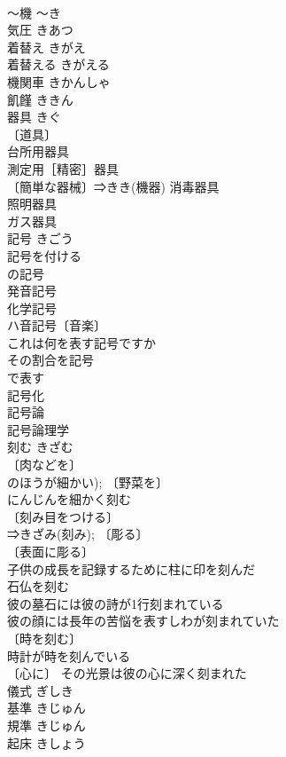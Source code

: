 \documentclass[8pt]{extreport}
\begin{document}
\begin{CJK}{UTF8}{min}
\\	～機	～き	
\\	気圧	きあつ	
\\	着替え	きがえ	
\\	着替える	きがえる	
\\	機関車	きかんしゃ	
\\	飢饉	ききん	
\\	器具	きぐ	
\\	〔道具〕
\\	台所用器具 
\\	測定用［精密］器具 
\\	〔簡単な器械〕⇒きき(機器) 消毒器具 
\\	照明器具 
\\	ガス器具 
\\	記号	きごう	
\\	記号を付ける 
\\	の記号 
\\	発音記号 
\\	化学記号 
\\	ハ音記号〔音楽〕 
\\	これは何を表す記号ですか 
\\	その割合を記号
\\	で表す 
\\	記号化 
\\	記号論 
\\	記号論理学 
\\	刻む	きざむ	
\\	〔肉などを〕
\\	のほうが細かい); 〔野菜を〕
\\	にんじんを細かく刻む 
\\	〔刻み目をつける〕
\\	⇒きざみ(刻み); 〔彫る〕
\\	〔表面に彫る〕
\\	子供の成長を記録するために柱に印を刻んだ 
\\	石仏を刻む 
\\	彼の墓石には彼の詩が1行刻まれている 
\\	彼の顔には長年の苦悩を表すしわが刻まれていた 
\\	〔時を刻む〕
\\	時計が時を刻んでいる 
\\	〔心に〕 その光景は彼の心に深く刻まれた 
\\	儀式	ぎしき	
\\	基準	きじゅん	
\\	規準	きじゅん	
\\	起床	きしょう	

\end{CJK}
\end{document}
